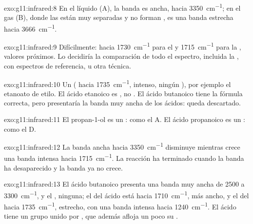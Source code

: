 \begin{solution}{exo:g11:infrared:8}
En el líquido (A), la banda  es ancha, hacia
\qty{3350}{cm^{-1}}; en el gas (B), donde las  están muy
separadas y no forman , es una banda estrecha hacia
\qty{3666}{cm^{-1}}.
\end{solution}

\begin{solution}{exo:g11:infrared:9}
Difícilmente: hacia \qty{1730}{cm^{-1}} para el  y
\qty{1715}{cm^{-1}} para la , valores próximos. Lo decidiría la
comparación de todo el espectro, incluida la , con espectros de referencia, u otra técnica.
\end{solution}

\begin{solution}{exo:g11:infrared:10}
Un  ( hacia \qty{1735}{cm^{-1}},  intenso, ningún
), por ejemplo el etanoato de etilo. El ácido etanoico es
, no . El ácido butanoico tiene la fórmula correcta,
pero presentaría la banda  muy ancha de los ácidos: queda
descartado.
\end{solution}

\begin{solution}{exo:g11:infrared:11}
El propan-1-ol es un : como el A. El ácido propanoico es un : como el D.
\end{solution}

\begin{solution}{exo:g11:infrared:12}
La banda  ancha hacia \qty{3350}{cm^{-1}} disminuye mientras
crece una banda  intensa hacia \qty{1715}{cm^{-1}}. La reacción
ha terminado cuando la banda  ha desaparecido y la banda
 ya no crece.
\end{solution}

\begin{solution}{exo:g11:infrared:13}
El ácido butanoico presenta una banda  muy ancha de 2500 a
\qty{3300}{cm^{-1}}, y el , ninguna; el  del ácido está
hacia \qty{1710}{cm^{-1}}, más ancho, y el del  hacia
\qty{1735}{cm^{-1}}, estrecho, con una banda  intensa hacia
\qty{1240}{cm^{-1}}. El ácido tiene un grupo  unido por , que además afloja un poco su .
\end{solution}

